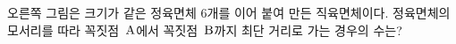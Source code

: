\noindent\begin{minipage}[t]{0.58\linewidth}\vspace{0pt}\raggedright 오른쪽 그림은 크기가 같은 정육면체 6개를 이어 붙여 만든 직육면체이다. 정육면체의 모서리를 따라 꼭짓점~$\mathrm{A}$에서 꼭짓점~$\mathrm{B}$까지 최단 거리로 가는 경우의 수는?\end{minipage}\hfill\begin{minipage}[t]{0.4\linewidth}\vspace{0pt}\centering \resizebox{\ifdim\width>\linewidth\linewidth\else\width\fi}{!}{}\end{minipage}\par
{}
